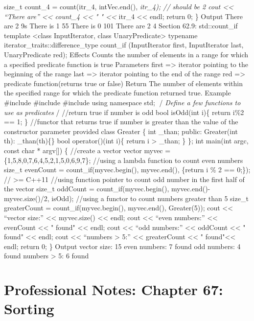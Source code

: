 size\_t count\_4 = count(itr\_4, intVec.end(), \emph{itr\_4); // should
be 2 cout \textless\textless{} ``There are'' \textless\textless{}
count\_4 \textless\textless{} " " \textless\textless{} }itr\_4
\textless\textless{} endl; return 0; \} Output There are 2 9s There is 1
55 There is 0 101 There are 2 4 Section 62.9: std::count\_if template
\textless class InputIterator, class UnaryPredicate\textgreater{}
typename iterator\_traits::difference\_type count\_if (InputIterator
first, InputIterator last, UnaryPredicate red); Eﬀects Counts the number
of elements in a range for which a speciﬁed predicate function is true
Parameters first =\textgreater{} iterator pointing to the beginning of
the range last =\textgreater{} iterator pointing to the end of the range
red =\textgreater{} predicate function(returns true or false) Return The
number of elements within the speciﬁed range for which the predicate
function returned true. Example \#include \#include \#include using
namespace std; /\emph{ Define a few functions to use as predicates }/
//return true if number is odd bool isOdd(int i)\{ return i\%2 == 1; \}
//functor that returns true if number is greater than the value of the
constructor parameter provided class Greater \{ int \_than; public:
Greater(int th): \_than(th)\{\} bool operator()(int i)\{ return i
\textgreater{} \_than; \} \}; int main(int argc, const char *
argv{[}{]}) \{ //create a vector vector myvec =
\{1,5,8,0,7,6,4,5,2,1,5,0,6,9,7\}; //using a lambda function to count
even numbers size\_t evenCount = count\_if(myvec.begin(), myvec.end(),
\href{int\%20i}{}\{return i \% 2 == 0;\}); // \textgreater= C++11
//using function pointer to count odd number in the first half of the
vector size\_t oddCount = count\_if(myvec.begin(), myvec.end()-
myvec.size()/2, isOdd); //using a functor to count numbers greater than
5 size\_t greaterCount = count\_if(myvec.begin(), myvec.end(),
Greater(5)); cout \textless\textless{} ``vector size:''
\textless\textless{} myvec.size() \textless\textless{} endl; cout
\textless\textless{} ``even numbers:'' \textless\textless{} evenCount
\textless\textless{} " found" \textless\textless{} endl; cout
\textless\textless{} ``odd numbers:'' \textless\textless{} oddCount
\textless\textless{} " found" \textless\textless{} endl; cout
\textless\textless{} ``numbers \textgreater{} 5:'' \textless\textless{}
greaterCount \textless\textless{} " found"\textless\textless{} endl;
return 0; \} Output vector size: 15 even numbers: 7 found odd numbers: 4
found numbers \textgreater{} 5: 6 found

\hypertarget{professional-notes-chapter-67-sorting-1}{%
\chapter{Professional Notes: Chapter 67:
Sorting}\label{professional-notes-chapter-67-sorting-1}}

